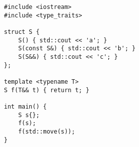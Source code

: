 \begin{lstlisting}[title=\href{https://godbolt.org/z/6xn1n3}{\texttt{godbolt.org/z/6xn1n3}}]
#include <iostream>
#include <type_traits>

struct S {
    S() { std::cout << 'a'; }
    S(const S&) { std::cout << 'b'; }
    S(S&&) { std::cout << 'c'; }
};

template <typename T>
S f(T&& t) { return t; }

int main() {
    S s{};
    f(s);
    f(std::move(s));
}
\end{lstlisting}
